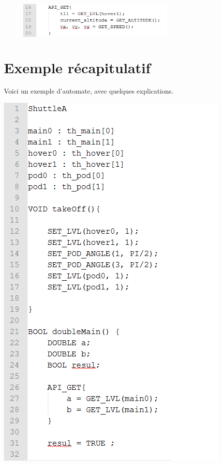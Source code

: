 \documentclass[a4paper,11pt]{article}
\begin{document}
\begin{figure}[!h]
            \begin{center}
                \includegraphics[width=0.7\textwidth]{img/apiget.png}
            \end{center}
\end{figure}

\pagebreak
\section{Exemple récapitulatif}

Voici un exemple d'automate, avec quelques explications.
\begin{center}
	\includegraphics[scale=0.75]{img/otto1.png}
\end{center}
\end{document}
